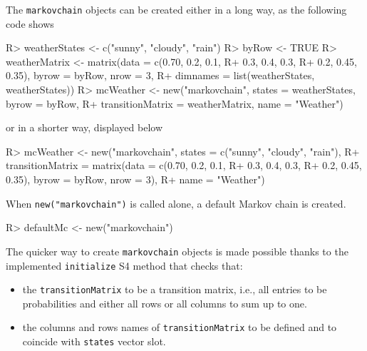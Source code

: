 \documentclass[
  nojss]{jss}
\providecommand{\tightlist}{%
  \setlength{\itemsep}{0pt}\setlength{\parskip}{0pt}}
\begin{document}
The \texttt{markovchain} objects can be created either in a long way, as the following code shows

\begin{CodeChunk}

\begin{CodeInput}
R> weatherStates <- c("sunny", "cloudy", "rain")
R> byRow <- TRUE
R> weatherMatrix <- matrix(data = c(0.70, 0.2, 0.1,
R+                        0.3, 0.4, 0.3,
R+                        0.2, 0.45, 0.35), byrow = byRow, nrow = 3,
R+                      dimnames = list(weatherStates, weatherStates))
R> mcWeather <- new("markovchain", states = weatherStates, byrow = byRow, 
R+                transitionMatrix = weatherMatrix, name = "Weather")
\end{CodeInput}
\end{CodeChunk}

or in a shorter way, displayed below

\begin{CodeChunk}

\begin{CodeInput}
R> mcWeather <- new("markovchain", states = c("sunny", "cloudy", "rain"),
R+                  transitionMatrix = matrix(data = c(0.70, 0.2, 0.1,
R+                        0.3, 0.4, 0.3,
R+                        0.2, 0.45, 0.35), byrow = byRow, nrow = 3), 
R+                  name = "Weather")
\end{CodeInput}
\end{CodeChunk}

When \texttt{new("markovchain")} is called alone, a default Markov chain is created.

\begin{CodeChunk}

\begin{CodeInput}
R> defaultMc <- new("markovchain")
\end{CodeInput}
\end{CodeChunk}

The quicker way to create \texttt{markovchain} objects is made possible thanks to the implemented \texttt{initialize} S4 method that checks that:

\begin{itemize}
\tightlist
\item
  the \texttt{transitionMatrix} to be a transition matrix, i.e., all entries to be probabilities and either all rows or all columns to sum up to one.
\item
  the columns and rows names of \texttt{transitionMatrix} to be defined and to coincide with \texttt{states} vector slot.
\end{itemize}
\end{document}
